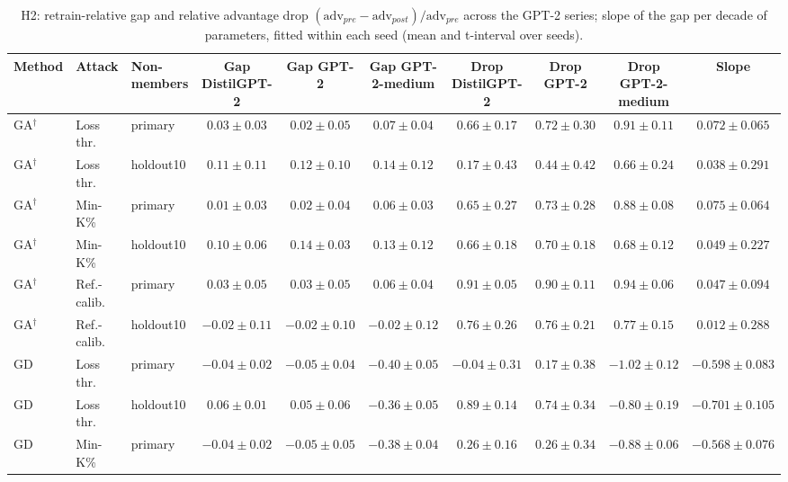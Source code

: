 \begin{table}[t]
\centering
\caption{H2: retrain-relative gap and relative advantage drop $(\mathrm{adv}_{pre}-\mathrm{adv}_{post})/\mathrm{adv}_{pre}$ across the GPT-2 series; slope of the gap per decade of parameters, fitted within each seed (mean and t-interval over seeds).}
\label{tab:h2}
\footnotesize
\renewcommand{\arraystretch}{1.2}
\setlength{\tabcolsep}{3pt}
\begin{tabular*}{\textwidth}{@{\extracolsep{\fill}}lllccccccc@{}}
\toprule
\textbf{Method} & \textbf{Attack} & \textbf{Non-members} & \textbf{Gap DistilGPT-2} & \textbf{Gap GPT-2} & \textbf{Gap GPT-2-medium} & \textbf{Drop DistilGPT-2} & \textbf{Drop GPT-2} & \textbf{Drop GPT-2-medium} & \textbf{Slope} \\
\midrule
GA$^{\dagger}$ & Loss thr. & primary & $0.03 \pm 0.03$ & $0.02 \pm 0.05$ & $0.07 \pm 0.04$ & $0.66 \pm 0.17$ & $0.72 \pm 0.30$ & $0.91 \pm 0.11$ & $0.072 \pm 0.065$ \\
GA$^{\dagger}$ & Loss thr. & holdout10 & $0.11 \pm 0.11$ & $0.12 \pm 0.10$ & $0.14 \pm 0.12$ & $0.17 \pm 0.43$ & $0.44 \pm 0.42$ & $0.66 \pm 0.24$ & $0.038 \pm 0.291$ \\
GA$^{\dagger}$ & Min-K\% & primary & $0.01 \pm 0.03$ & $0.02 \pm 0.04$ & $0.06 \pm 0.03$ & $0.65 \pm 0.27$ & $0.73 \pm 0.28$ & $0.88 \pm 0.08$ & $0.075 \pm 0.064$ \\
GA$^{\dagger}$ & Min-K\% & holdout10 & $0.10 \pm 0.06$ & $0.14 \pm 0.03$ & $0.13 \pm 0.12$ & $0.66 \pm 0.18$ & $0.70 \pm 0.18$ & $0.68 \pm 0.12$ & $0.049 \pm 0.227$ \\
GA$^{\dagger}$ & Ref.-calib. & primary & $0.03 \pm 0.05$ & $0.03 \pm 0.05$ & $0.06 \pm 0.04$ & $0.91 \pm 0.05$ & $0.90 \pm 0.11$ & $0.94 \pm 0.06$ & $0.047 \pm 0.094$ \\
GA$^{\dagger}$ & Ref.-calib. & holdout10 & $-0.02 \pm 0.11$ & $-0.02 \pm 0.10$ & $-0.02 \pm 0.12$ & $0.76 \pm 0.26$ & $0.76 \pm 0.21$ & $0.77 \pm 0.15$ & $0.012 \pm 0.288$ \\
GD & Loss thr. & primary & $-0.04 \pm 0.02$ & $-0.05 \pm 0.04$ & $-0.40 \pm 0.05$ & $-0.04 \pm 0.31$ & $0.17 \pm 0.38$ & $-1.02 \pm 0.12$ & $-0.598 \pm 0.083$ \\
GD & Loss thr. & holdout10 & $0.06 \pm 0.01$ & $0.05 \pm 0.06$ & $-0.36 \pm 0.05$ & $0.89 \pm 0.14$ & $0.74 \pm 0.34$ & $-0.80 \pm 0.19$ & $-0.701 \pm 0.105$ \\
GD & Min-K\% & primary & $-0.04 \pm 0.02$ & $-0.05 \pm 0.05$ & $-0.38 \pm 0.04$ & $0.26 \pm 0.16$ & $0.26 \pm 0.34$ & $-0.88 \pm 0.06$ & $-0.568 \pm 0.076$ \\

\end{tabular*}
\end{table}
